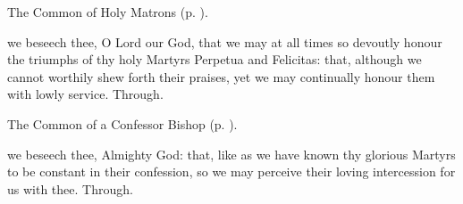 \begin{rubric}
	The Common of Holy Matrons (p. \pageref{CommonHolyMatrons}).
\end{rubric}

 we beseech thee, O Lord our God, that we may at all times so devoutly honour the triumphs of thy holy Martyrs Perpetua and Felicitas: that, although we cannot worthily shew forth their praises, yet we may continually honour them with lowly service. Through.



\begin{rubric}
	The Common of a Confessor Bishop (p. \pageref{ConfessorBishopDoctorCollect}).
\end{rubric}



\memorialCollect
{} we beseech thee, Almighty God: that, like as we have known thy glorious Martyrs to be constant in their confession, so we may perceive their loving intercession for us with thee. Through.



